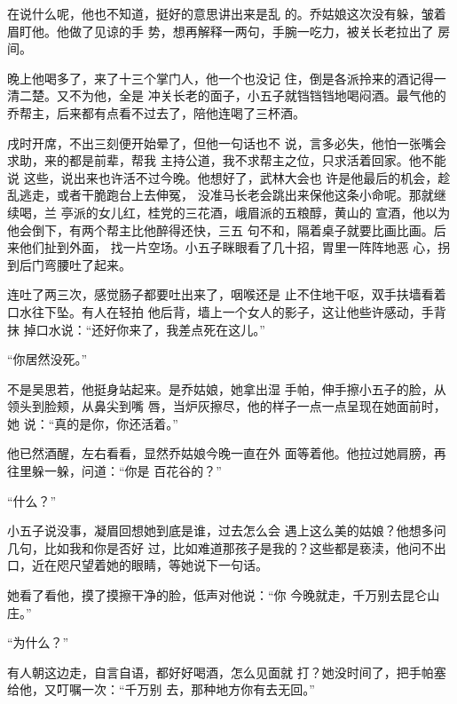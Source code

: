 在说什么呢，他也不知道，挺好的意思讲出来是乱
的。乔姑娘这次没有躲，皱着眉盯他。他做了见谅的手
势，想再解释一两句，手腕一吃力，被关长老拉出了
房间。

晚上他喝多了，来了十三个掌门人，他一个也没记
住，倒是各派拎来的酒记得一清二楚。又不为他，全是
冲关长老的面子，小五子就铛铛铛地喝闷酒。最气他的
乔帮主，后来都有点看不过去了，陪他连喝了三杯酒。

戌时开席，不出三刻便开始晕了，但他一句话也不
说，言多必失，他怕一张嘴会求助，来的都是前辈，帮我
主持公道，我不求帮主之位，只求活着回家。他不能说
这些，说出来也许活不过今晚。他想好了，武林大会也
许是他最后的机会，趁乱逃走，或者干脆跑台上去伸冤，
没准马长老会跳出来保他这条小命呢。那就继续喝，兰
亭派的女儿红，桂党的三花酒，峨眉派的五粮醇，黄山的
宣酒，他以为他会倒下，有两个帮主比他醉得还快，三五
句不和，隔着桌子就要比画比画。后来他们扯到外面，
找一片空场。小五子眯眼看了几十招，胃里一阵阵地恶
心，拐到后门弯腰吐了起来。

连吐了两三次，感觉肠子都要吐出来了，咽喉还是
止不住地干呕，双手扶墙看着口水往下坠。有人在轻拍
他后背，墙上一个女人的影子，这让他些许感动，手背抹
掉口水说：“还好你来了，我差点死在这儿。”

“你居然没死。”

不是吴思若，他挺身站起来。是乔姑娘，她拿出湿
手帕，伸手擦小五子的脸，从领头到脸颊，从鼻尖到嘴
唇，当炉灰擦尽，他的样子一点一点呈现在她面前时，她
说：“真的是你，你还活着。”

他已然酒醒，左右看看，显然乔姑娘今晚一直在外
面等着他。他拉过她肩膀，再往里躲一躲，问道：“你是
百花谷的？”

“什么？”

小五子说没事，凝眉回想她到底是谁，过去怎么会
遇上这么美的姑娘？他想多问几句，比如我和你是否好
过，比如难道那孩子是我的？这些都是亵渎，他问不出
口，近在咫尺望着她的眼睛，等她说下一句话。

她看了看他，摸了摸擦干净的脸，低声对他说：“你
今晚就走，千万别去昆仑山庄。”

“为什么？”

有人朝这边走，自言自语，都好好喝酒，怎么见面就
打？她没时间了，把手帕塞给他，又叮嘱一次：“千万别
去，那种地方你有去无回。”

\newpage